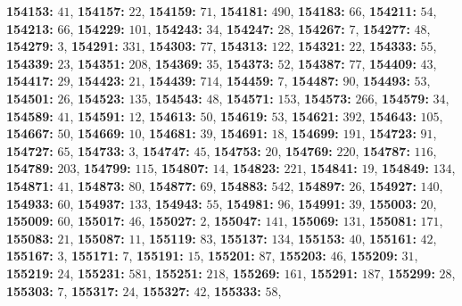 \textsf{\bfseries 154153:} $41$, \textsf{\bfseries 154157:} $22$, \textsf{\bfseries 154159:} $71$, \textsf{\bfseries 154181:} $490$, \textsf{\bfseries 154183:} $66$, \textsf{\bfseries 154211:} $54$, \textsf{\bfseries 154213:} $66$, \textsf{\bfseries 154229:} $101$, \textsf{\bfseries 154243:} $34$, \textsf{\bfseries 154247:} $28$, \textsf{\bfseries 154267:} $7$, \textsf{\bfseries 154277:} $48$, \textsf{\bfseries 154279:} $3$, \textsf{\bfseries 154291:} $331$, \textsf{\bfseries 154303:} $77$, \textsf{\bfseries 154313:} $122$, \textsf{\bfseries 154321:} $22$, \textsf{\bfseries 154333:} $55$, \textsf{\bfseries 154339:} $23$, \textsf{\bfseries 154351:} $208$, \textsf{\bfseries 154369:} $35$, \textsf{\bfseries 154373:} $52$, \textsf{\bfseries 154387:} $77$, \textsf{\bfseries 154409:} $43$, \textsf{\bfseries 154417:} $29$, \textsf{\bfseries 154423:} $21$, \textsf{\bfseries 154439:} $714$, \textsf{\bfseries 154459:} $7$, \textsf{\bfseries 154487:} $90$, \textsf{\bfseries 154493:} $53$, \textsf{\bfseries 154501:} $26$, \textsf{\bfseries 154523:} $135$, \textsf{\bfseries 154543:} $48$, \textsf{\bfseries 154571:} $153$, \textsf{\bfseries 154573:} $266$, \textsf{\bfseries 154579:} $34$, \textsf{\bfseries 154589:} $41$, \textsf{\bfseries 154591:} $12$, \textsf{\bfseries 154613:} $50$, \textsf{\bfseries 154619:} $53$, \textsf{\bfseries 154621:} $392$, \textsf{\bfseries 154643:} $105$, \textsf{\bfseries 154667:} $50$, \textsf{\bfseries 154669:} $10$, \textsf{\bfseries 154681:} $39$, \textsf{\bfseries 154691:} $18$, \textsf{\bfseries 154699:} $191$, \textsf{\bfseries 154723:} $91$, \textsf{\bfseries 154727:} $65$, \textsf{\bfseries 154733:} $3$, \textsf{\bfseries 154747:} $45$, \textsf{\bfseries 154753:} $20$, \textsf{\bfseries 154769:} $220$, \textsf{\bfseries 154787:} $116$, \textsf{\bfseries 154789:} $203$, \textsf{\bfseries 154799:} $115$, \textsf{\bfseries 154807:} $14$, \textsf{\bfseries 154823:} $221$, \textsf{\bfseries 154841:} $19$, \textsf{\bfseries 154849:} $134$, \textsf{\bfseries 154871:} $41$, \textsf{\bfseries 154873:} $80$, \textsf{\bfseries 154877:} $69$, \textsf{\bfseries 154883:} $542$, \textsf{\bfseries 154897:} $26$, \textsf{\bfseries 154927:} $140$, \textsf{\bfseries 154933:} $60$, \textsf{\bfseries 154937:} $133$, \textsf{\bfseries 154943:} $55$, \textsf{\bfseries 154981:} $96$, \textsf{\bfseries 154991:} $39$, \textsf{\bfseries 155003:} $20$, \textsf{\bfseries 155009:} $60$, \textsf{\bfseries 155017:} $46$, \textsf{\bfseries 155027:} $2$, \textsf{\bfseries 155047:} $141$, \textsf{\bfseries 155069:} $131$, \textsf{\bfseries 155081:} $171$, \textsf{\bfseries 155083:} $21$, \textsf{\bfseries 155087:} $11$, \textsf{\bfseries 155119:} $83$, \textsf{\bfseries 155137:} $134$, \textsf{\bfseries 155153:} $40$, \textsf{\bfseries 155161:} $42$, \textsf{\bfseries 155167:} $3$, \textsf{\bfseries 155171:} $7$, \textsf{\bfseries 155191:} $15$, \textsf{\bfseries 155201:} $87$, \textsf{\bfseries 155203:} $46$, \textsf{\bfseries 155209:} $31$, \textsf{\bfseries 155219:} $24$, \textsf{\bfseries 155231:} $581$, \textsf{\bfseries 155251:} $218$, \textsf{\bfseries 155269:} $161$, \textsf{\bfseries 155291:} $187$, \textsf{\bfseries 155299:} $28$, \textsf{\bfseries 155303:} $7$, \textsf{\bfseries 155317:} $24$, \textsf{\bfseries 155327:} $42$, \textsf{\bfseries 155333:} $58$, 
